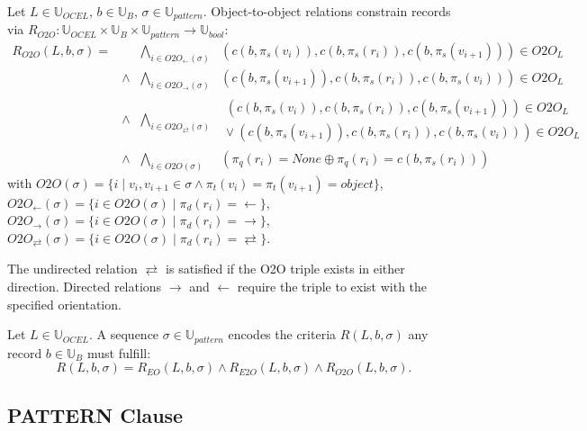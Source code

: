 \begin{frameddef}
Let $L \in \mathbb{U}_{OCEL}$, $b \in \mathbb{U}_B$, $\sigma \in \mathbb{U}_{pattern}$. Object-to-object relations constrain records via $R_{O2O} : \mathbb{U}_{OCEL} \times \mathbb{U}_B \times \mathbb{U}_{pattern} \to \mathbb{U}_{bool}$:
\[
\begin{array}{rrrl}
R_{O2O}(L, b, \sigma) = & & \displaystyle \bigwedge_{i \in O2O_{\leftarrow}(\sigma)} & (c(b, \pi_s(v_i)), c(b, \pi_s(r_i)), c(b, \pi_s(v_{i+1}))) \in O2O_L \\
& \land & \displaystyle \bigwedge_{i \in O2O_{\rightarrow}(\sigma)} & (c(b, \pi_s(v_{i+1})), c(b, \pi_s(r_i)), c(b, \pi_s(v_i))) \in O2O_L \\
& \land & \displaystyle \bigwedge_{i \in O2O_{\rightleftarrows}(\sigma)} & \begin{gathered} (c(b, \pi_s(v_i)), c(b, \pi_s(r_i)), c(b, \pi_s(v_{i+1}))) \in O2O_L \\ \lor\ (c(b, \pi_s(v_{i+1})), c(b, \pi_s(r_i)), c(b, \pi_s(v_i))) \in O2O_L \end{gathered} \\
& \land & \displaystyle \bigwedge_{i \in O2O(\sigma)} & (\pi_q(r_i) = None \oplus \pi_q(r_i) = c(b, \pi_s(r_i)))
\end{array}
\]
with $O2O(\sigma) = \{ i \mid v_i, v_{i+1} \in \sigma \land \pi_t(v_i) = \pi_t(v_{i+1}) = object \}$, $O2O_{\leftarrow}(\sigma) = \{ i \in O2O(\sigma) \mid \pi_d(r_i) = \leftarrow \}$, $O2O_{\rightarrow}(\sigma) = \{ i \in O2O(\sigma) \mid \pi_d(r_i) = \rightarrow \}$, $O2O_{\rightleftarrows}(\sigma) = \{ i \in O2O(\sigma) \mid \pi_d(r_i) = \rightleftarrows \}$.
\end{frameddef}

The undirected relation $\rightleftarrows$ is satisfied if the O2O triple exists in either direction. Directed relations $\rightarrow$ and $\leftarrow$ require the triple to exist with the specified orientation.

\begin{frameddef}
Let $L \in \mathbb{U}_{OCEL}$. A sequence $\sigma \in \mathbb{U}_{pattern}$ encodes the criteria $R(L, b, \sigma)$ any record $b \in \mathbb{U}_B$ must fulfill:
\[
R(L, b, \sigma) = R_{EO}(L, b, \sigma) \land R_{E2O}(L, b, \sigma) \land R_{O2O}(L, b, \sigma).
\]
\end{frameddef}

\subsection{PATTERN Clause}

